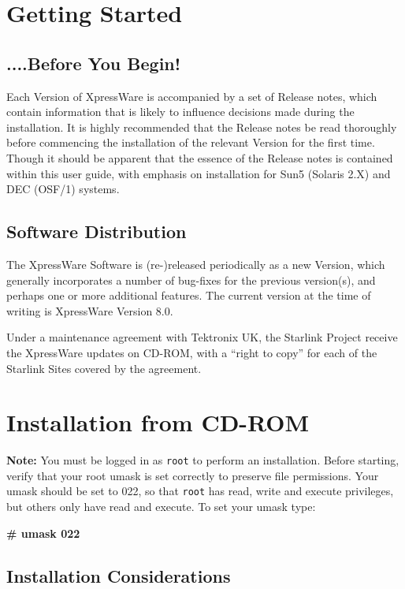 \section {Getting Started}


\subsection {....Before You Begin!}

Each Version of XpressWare is accompanied by a set of Release notes, which
contain information that is likely to influence decisions made during the
installation. It is highly recommended that the Release notes be read thoroughly
before commencing the installation of the relevant Version for the first time.
Though it should be apparent that the essence of the Release notes is contained
within this user guide, with emphasis on installation for Sun5 (Solaris 2.X)
and DEC (OSF/1) systems.


\subsection {Software Distribution}

The XpressWare Software is (re-)released periodically as a new Version, which
generally incorporates a number of bug-fixes for the previous version(s), and
perhaps one or more additional features. The current version at the time of
writing is XpressWare Version 8.0.

Under a maintenance agreement with Tektronix UK, the Starlink Project receive
the XpressWare updates on CD-ROM, with a ``right to copy'' for each of the
Starlink Sites covered by the agreement.


\section {Installation from CD-ROM}

{\bf Note:} You must be logged in as {\tt root} to perform an installation.
Before starting, verify that your root umask is set correctly to preserve file
permissions. Your umask should be set to 022, so that {\tt root} has read,
write and execute privileges, but others only have read and execute. To set your
umask type:

{\bf \# umask 022}


\subsection {Installation Considerations}

